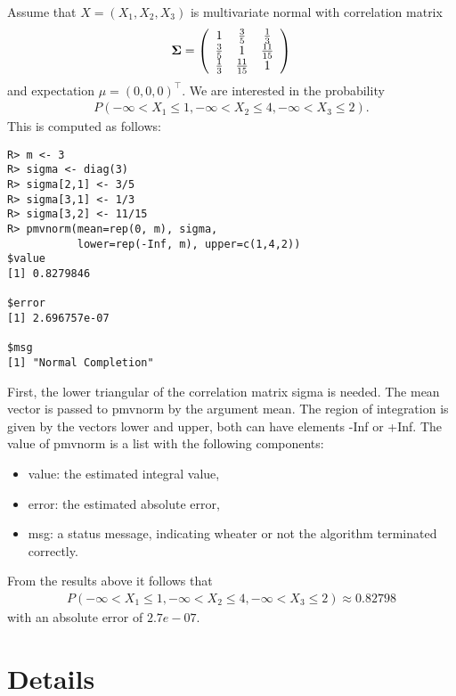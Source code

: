 \documentclass[11pt]{amsart}
\newcommand{\Sig}{\mbox{\boldmath $\Sigma$}}
\begin{document}
Assume that $ X = (X_1, X_2, X_3) $ is multivariate normal with correlation
matrix
\begin{eqnarray*}
\Sig = \left( \begin{array}{ccc} 1 & \frac{3}{5} & \frac{1}{3} \\
\frac{3}{5} & 1 & \frac{11}{15} \\
\frac{1}{3} & \frac{11}{15} & 1 \end{array} \right)
\end{eqnarray*}
and expectation $ \mu = (0,0,0)^{\top} $. We are interested in the probability 
\begin{eqnarray*}
P(-\infty < X_1 \le 1, -\infty < X_2 \le 4, -\infty < X_3 \le 2). 
\end{eqnarray*}
This is computed as follows:
\begin{verbatim}
R> m <- 3
R> sigma <- diag(3)
R> sigma[2,1] <- 3/5
R> sigma[3,1] <- 1/3
R> sigma[3,2] <- 11/15
R> pmvnorm(mean=rep(0, m), sigma, 
           lower=rep(-Inf, m), upper=c(1,4,2))
$value
[1] 0.8279846

$error
[1] 2.696757e-07

$msg
[1] "Normal Completion"
\end{verbatim}
First, the lower triangular of the correlation matrix {\ttfamily sigma} 
is needed. The mean
vector is passed to {\ttfamily pmvnorm} by the argument {\ttfamily mean}. 
The region of
integration is given by the vectors {\ttfamily lower} and {\ttfamily upper}, 
both can have elements {\ttfamily -Inf} or {\ttfamily +Inf}. The value of {\ttfamily pmvnorm}
is a list with the following components:
\begin{itemize}
\item {\ttfamily value}: the estimated integral value,
\item {\ttfamily error}: the estimated absolute error,
\item {\ttfamily msg}: a status message, indicating wheater or not the algorithm
terminated correctly.
\end{itemize}
From the results above it follows that
\begin{eqnarray*}
P(-\infty < X_1 \le 1, -\infty < X_2 \le 4, -\infty < X_3 \le 2) \approx
0.82798
\end{eqnarray*}
with an absolute error of $2.7e-07$. 

\section{Details \label{details}}
\end{document}
